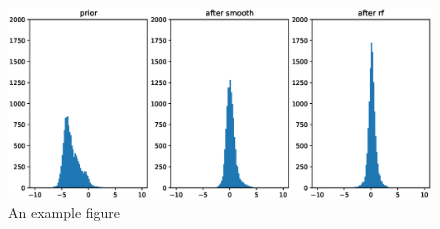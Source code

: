 \documentclass[journal=jprobs,manuscript=article]{achemso}
\begin{document}
\begin{figure}
  \includegraphics[scale=0.6]{figure_1.eps}
  \caption{An example figure}
  \label{fgr:figure1}
\end{figure}

%
%
%
%
\end{document}

